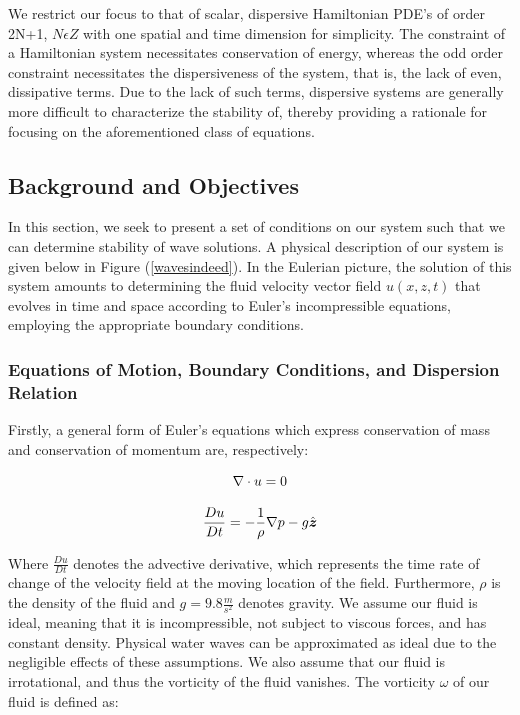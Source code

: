 \documentclass{article}
\begin{document}
 We restrict our focus to that of scalar, dispersive Hamiltonian PDE’s of order 2N+1, \(N \epsilon Z\) with one spatial and time dimension for simplicity. The constraint of a Hamiltonian system necessitates conservation of energy, whereas the odd order constraint necessitates the dispersiveness of the system, that is, the lack of even, dissipative terms. Due to the lack of such terms, dispersive systems are generally more difficult to characterize the stability of, thereby providing a rationale for focusing on the aforementioned class of equations. \\
 
 \clearpage
 
 \subsection{Background and Objectives}
 
  In this section, we seek to present a set of conditions on our system such that we can determine stability of wave solutions. A physical description of our system is given below in Figure (\ref{wavesindeed}). In the Eulerian picture, the solution of this system amounts to determining the fluid velocity vector field \(u(x,z,t)\) that evolves in time and space according to Euler's incompressible equations, employing the appropriate boundary conditions. 
  
  
  \subsubsection{Equations of Motion, Boundary Conditions, and Dispersion Relation}
  
  
  Firstly, a general form of Euler's equations which express conservation of mass and conservation of momentum are, respectively:
  
  \begin{equation} \label{mass}
  \nabla \cdot u = 0  \\
\end{equation}

\begin{equation} \label{eq1}
  \frac{D u}{D t} = -\frac{1}{\rho}\nabla p 
  -g \hat{\boldsymbol{z}}  \\
  \end{equation}

Where \(\frac{D u}{D t}\) denotes the advective derivative, which represents the time rate of change of the velocity field at the moving location of the field. Furthermore, \(\rho\) is the density of the fluid and \(g = 9.8 \frac{m}{s^2}\) denotes gravity. We assume our fluid is ideal, meaning that it is incompressible, not subject to viscous forces, and has constant density. Physical water waves can be approximated as ideal due to the negligible effects of these assumptions. We also assume that our fluid is irrotational, and thus the vorticity of the fluid vanishes. The vorticity \( \omega \) of our fluid is defined as: \\
\end{document}
